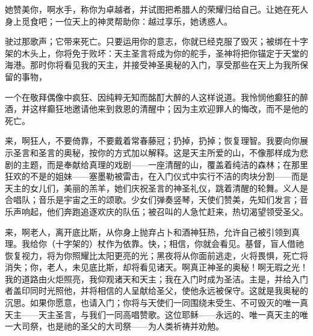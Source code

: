 \par

她赞美你，啊水手，称你为卓越者，并试图把希腊人的荣耀归给自己。让她在死人身上觅食吧；一位天上的神灵帮助你：越过享乐，她诱惑人。\par

\par

驶过那歌声；它带来死亡。只要运用你的意志，你就已经克服了毁灭；被绑在十字架的木头上，你将免于败坏：天主圣言将成为你的舵手，圣神将把你锚定于天堂的海港。那时你将看见我的天主，并接受神圣奥秘的入门，享受那些在天上为我所保留的事物， \par

\par

一个在敬拜偶像中疯狂、因纯粹无知而酩酊大醉的人这样说道。我怜悯他癫狂的醉酒，并这样癫狂地邀请他来到救恩的清醒中；因为主欢迎罪人的悔改，而不是他的死亡。\par

来，啊狂人，不要倚靠，不要戴着常春藤冠；扔掉，扔掉；恢复理智。我要向你展示圣言和圣言的奥秘，按你的方式加以解释。这是天主所爱的山，不像那样成为悲剧的主题，而是奉献给真理的戏剧——一座清醒的山，覆盖着纯洁的森林；在那里狂欢的不是的姐妹——塞墨勒被雷击，在入门仪式中实行不洁的肉块分割——而是天主的女儿们，美丽的羔羊，她们庆祝圣言的神圣礼仪，跳着清醒的轮舞。义人是合唱队；音乐是宇宙之王的颂歌。少女们弹奏竖琴，天使们赞美，先知们发言；音乐声响起，他们奔跑追逐欢庆的队伍；被召叫的人急忙赶来，热切渴望领受圣父。\par

来，啊老人，离开底比斯，从你身上抛弃占卜和酒神狂热，允许自己被引领到真理。我给你（十字架的）杖作为依靠。快，；相信，你就会看见。基督，盲人借祂恢复视力，将为你照耀比太阳更亮的光；黑夜将从你面前逃走，火将畏惧，死亡将消失；你，老人，未见底比斯，却将看见诸天。啊真正神圣的奥秘！啊无瑕之光！我的道路由火炬照亮，我仰观诸天和天主；我在入门时成为圣洁。主是，并给入门者盖印同时光照他，并将相信的人呈献给圣父，使他永远被保守。这就是我奥秘的沉思。如果你愿意，也请入门；你将与天使们一同围绕未受生、不可毁灭的唯一真天主——天主圣言，与我们一同高唱赞歌。这位耶稣——永远的、唯一真天主的唯一大司祭，也是祂的圣父的大司祭——为人类祈祷并劝勉。\par

